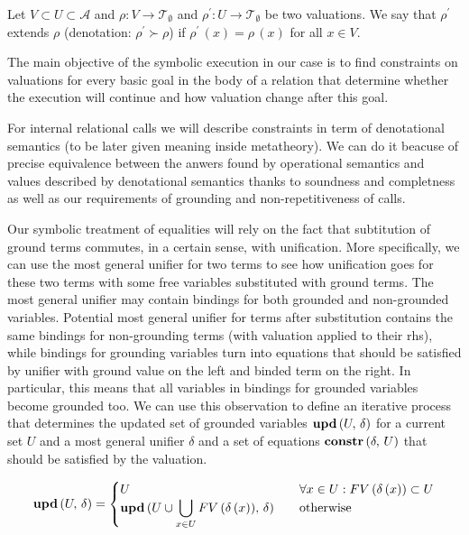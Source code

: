 \begin{definition}
  Let $ V \subset U \subset \mathcal{A} $ and $ \rho \colon V \to \mathcal{T}_{\emptyset} $ and $ \rho^\prime \colon U \to \mathcal{T}_{\emptyset} $ be two valuations. We say that $\rho^\prime$ extends $\rho$ (denotation: $ \rho^\prime \succ \rho$) if $\rho^\prime\,(x) = \rho\,(x)$ for all $x \in V$.
\end{definition}

The main objective of the symbolic execution in our case is to find constraints on valuations for every basic goal in the body of a relation that determine whether the execution will continue and how valuation change after this goal.

For internal relational calls we will describe constraints in term of denotational semantics (to be later given meaning inside metatheory). We can do it beacuse of precise equivalence between the anwers found by operational semantics and values described by denotational semantics thanks to soundness and completness as well as our requirements of grounding and non-repetitiveness of calls.

Our symbolic treatment of equalities will rely on the fact that subtitution of ground terms commutes, in a certain sense, with unification. More specifically, we can use the most general unifier for two terms to see how unification goes for these two terms with some free variables substituted with ground terms. The most general unifier may contain bindings for both grounded and non-grounded variables. Potential most general unifier for terms after substitution contains the same bindings for non-grounding terms (with valuation applied to their rhs), while bindings for grounding variables turn into equations that should be satisfied by unifier with ground value on the left and binded term on the right. In particular, this means that all variables in bindings for grounded variables become grounded too. We can use this observation to define an iterative process that determines the updated set of grounded variables $\mbox{\textbf{upd}}\,(U,\, \delta)$ for a current set $U$ and a most general unifier $\delta$ and a set of equations $\mbox{\textbf{constr}}\,(\delta,\, U)$ that should be satisfied by the valuation.

\[
\mbox{\textbf{upd}}\,(U,\, \delta) = \begin{cases}
                           U & \quad\forall x \in U : FV\,(\delta\,(x)) \subset U \\
                           \mbox{\textbf{upd}}\,(U \cup \displaystyle\bigcup\limits_{x \in U} FV\,(\delta\,(x)),\, \delta) & \quad\mbox{otherwise}
                          \end{cases}
\]

